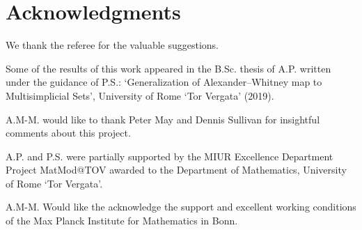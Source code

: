 
\section*{Acknowledgments}
We thank the referee for the valuable suggestions.

Some of the results of this work appeared in the B.Sc. thesis of A.P. written under the guidance of P.S.: `Generalization of Alexander--Whitney map to Multisimplicial Sets', University of Rome `Tor Vergata' (2019).

A.M-M. would like to thank Peter May and Dennis Sullivan for insightful comments about this project.

A.P. and P.S. were partially supported by the MIUR Excellence Department Project MatMod@TOV awarded to the Department of Mathematics, University of Rome `Tor Vergata'.

A.M-M. Would like the acknowledge the support and excellent working conditions of the Max Planck Institute for Mathematics in Bonn.